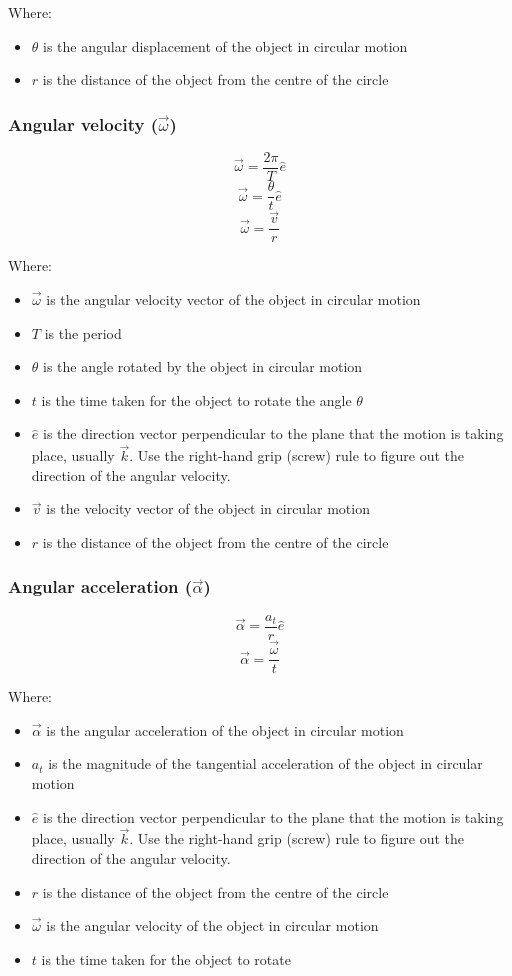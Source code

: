 \documentclass[11pt]{article}
\begin{document}
Where:
\begin{itemize}
\item \(\theta\) is the angular displacement of the object in circular motion
\item \(r\) is the distance of the object from the centre of the circle
\end{itemize}
\subsubsection{Angular velocity (\(\vec{\omega}\))}
\label{sec:orgb24b788}
\[\vec{\omega} = \frac{2 \pi}{T} \hat{e}\]
\[\vec{\omega} = \frac{\theta}{t} \hat{e}\]
\[\vec{\omega} = \frac{\vec{v}}{r}\]

Where:
\begin{itemize}
\item \(\vec{\omega}\) is the angular velocity vector of the object in circular motion
\item \(T\) is the period
\item \(\theta\) is the angle rotated by the object in circular motion
\item \(t\) is the time taken for the object to rotate the angle \(\theta\)
\item \(\hat{e}\) is the direction vector perpendicular to the plane that the motion is taking place, usually \(\vec{k}\). Use the right-hand grip (screw) rule to figure out the direction of the angular velocity.
\item \(\vec{v}\) is the velocity vector of the object in circular motion
\item \(r\) is the distance of the object from the centre of the circle
\end{itemize}

 \newpage
\subsubsection{Angular acceleration (\(\vec{\alpha}\))}
\label{sec:org616f969}
\[\vec{\alpha} = \frac{a_t}{r} \hat{e}\]
\[\vec{\alpha} = \frac{\vec{\omega}}{t}\]

Where:
\begin{itemize}
\item \(\vec{\alpha}\) is the angular acceleration of the object in circular motion
\item \(a_t\) is the magnitude of the tangential acceleration of the object in circular motion
\item \(\hat{e}\) is the direction vector perpendicular to the plane that the motion is taking place, usually \(\vec{k}\). Use the right-hand grip (screw) rule to figure out the direction of the angular velocity.
\item \(r\) is the distance of the object from the centre of the circle
\item \(\vec{\omega}\) is the angular velocity of the object in circular motion
\item \(t\) is the time taken for the object to rotate
\end{itemize}
\end{document}
